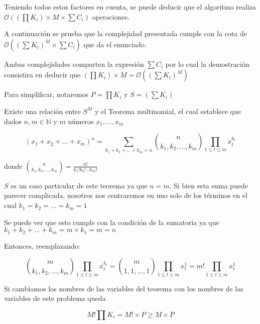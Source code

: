 Teniendo todos estos factores en cuenta, se puede deducir que el algoritmo realiza $\mathcal{O}((\prod K_i) \times M \times \sum C_i)$ operaciones.

A continuación se prueba que la complejidad presentada cumple con la cota de $\mathcal{O}((\sum K_i)^M \times \sum C_i)$ que da el enunciado.

Ambas complejidades comparten la expresión $\sum C_i$ por lo cual la demostración consistira en deducir que $(\prod K_i) \times M = \mathcal{O}((\sum K_i)^M)$

Para simplificar, notaremos $P = \prod K_i$ y $S = (\sum K_i)$

Existe una relación entre $S^M$ y el Teorema multinomial, el cual establece que dados $n, m \in \mathbb{N}$ y $m$ números $x_1, \ldots , x_m$

$$(x_1 + x_2 + \ldots + x_m)^n = \sum_{k_1 + k_2 + \ldots + k_m = n} \binom{n}{k_1, k_2, \ldots , k_m} \prod_{1 \leq t \leq m} x_t^{k_t}$$

donde $\binom{n}{k_1, k_2, \ldots , k_m} = \frac{n!}{k_1! k_2! \ldots k_m!}$

$S$ es un caso particular de este teorema ya que $n = m$. Si bien esta suma puede parecer complicada, nosotros nos centraremos en uno solo de los términos en el cual $k_1 = k_2 = \ldots = k_m = 1$

Se puede ver que esto cumple con la condición de la sumatoria ya que $k_1 + k_2 + \ldots + k_m = m \times k_1 = m = n$

Entonces, reemplazando:

$$ \binom{m}{k_1, k_2, \ldots , k_m} \prod_{1 \leq t \leq m} x_t^{k_t} = \binom{m}{1, 1, \ldots , 1} \prod_{1 \leq t \leq m} x_t^{1} = m! \prod_{1 \leq t \leq m} x_t^{1} $$

Si cambiamos los nombres de las variables del teorema con los nombres de las variables de este problema queda

$$M! \prod K_i = M! \times P \geq M \times P$$